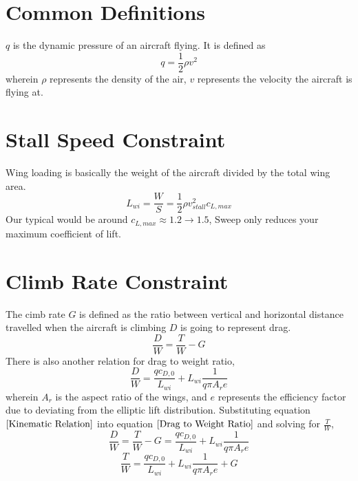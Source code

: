 \documentclass[letter, 12pt]{article}
\begin{document}
\begin{center}
\section{Common Definitions}
\begin{comment}
\end{comment}
$q$ is the dynamic pressure of an aircraft flying. It is defined as
$$q = \frac{1}{2}\rho v^{2}$$
wherein $\rho$ represents the density of the air, $v$ represents the velocity the aircraft is flying at.

\section{Stall Speed Constraint}
\begin{comment}
\end{comment}
Wing loading is basically the weight of the aircraft divided by the total wing area.
$$L_{wi} = \frac{W}{S} = \frac{1}{2}\rho v_{stall}^{2} c_{L,max}$$
Our typical would be around $c_{L,max} \approx 1.2 \to 1.5$, 
Sweep only reduces your maximum coefficient of lift. 

\section{Climb Rate Constraint}
\begin{comment}
\end{comment}
The cimb rate $G$ is defined as the ratio between vertical and horizontal distance travelled when the aircraft is climbing
$D$ is going to represent drag. 
\begin{equation}\frac{D}{W} = \frac{T}{W } - G \label{Kinematic Relation}\end{equation}
There is also another relation for drag to weight ratio,
\begin{equation}\frac{D}{W } = \frac{qc_{D,0}}{L_{wi}} + L_{wi}\frac{1}{q\pi A_{r}e} \label{Drag to Weight Ratio}\end{equation}
wherein $A_{r}$ is the aspect ratio of the wings, and $e$ represents the efficiency factor due to deviating from the elliptic lift distribution.
Substituting equation $\ref{Kinematic Relation}$ into equation $\ref{Drag to Weight Ratio}$ and solving for $\displaystyle\frac{T}{W }$,
$$\frac{D}{W } = \frac{T}{W } - G  = \frac{qc_{D,0}}{L_{wi}} + L_{wi}\frac{1}{q\pi A_{r}e} $$
$$\frac{T}{W }  = \frac{qc_{D,0}}{L_{wi}} + L_{wi}\frac{1}{q\pi A_{r}e} + G $$


\end{center}
\end{document}
